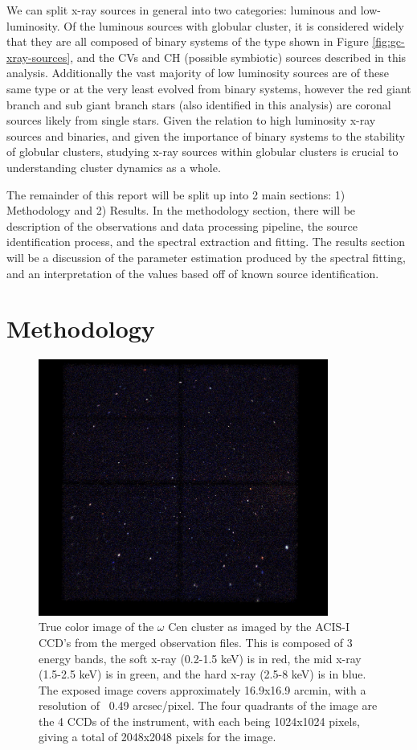 \documentclass[aps,
                pra,  
                a4paper, 
                amsmath, 
                amssymb, 
                preprint,
                tightenlines,  
                amsfonts,
                nofootinbib,
                notitlepage
            ]{revtex4-2}
\begin{document}
We can split x-ray sources in general into two categories: luminous and low-luminosity. Of the luminous sources with globular cluster, it is considered widely that they are all composed of binary systems of the type shown in Figure \ref{fig:gc-xray-sources}, and the CVs and CH (possible symbiotic) sources described in this analysis. Additionally the vast majority of low luminosity sources are of these same type or at the very least evolved from binary systems, however the red giant branch and sub giant branch stars (also identified in this analysis) are coronal sources likely from single stars. Given the relation to high luminosity x-ray sources and binaries, and given the importance of binary systems to the stability of globular clusters, studying x-ray sources within globular clusters is crucial to understanding cluster dynamics as a whole\cite{Verbunt2004,Henleywillis2018}. 
\par
The remainder of this report will be split up into 2 main sections: 1) Methodology and 2) Results. In the methodology section, there will be description of the observations and data processing pipeline, the source identification process, and the spectral extraction and fitting. The results section will be a discussion of the parameter estimation produced by the spectral fitting, and an interpretation of the values based off of known source identification.  

\section{Methodology}
\begin{figure}
    \centering
    \includegraphics[width=0.85\textwidth]{img/truecolor-mx0.75-edit-bright.jpg}
    \caption{True color image of the $\omega$ Cen cluster as imaged by the ACIS-I CCD's from the merged observation files. This is composed of 3 energy bands, the soft x-ray (0.2-1.5 keV) is in red, the mid x-ray (1.5-2.5 keV) is in green, and the hard x-ray (2.5-8 keV) is in blue. The exposed image covers approximately 16.9x16.9 arcmin, with a resolution of ~0.49 arcsec/pixel. The four quadrants of the image are the 4 CCDs of the instrument, with each being 1024x1024 pixels, giving a total of 2048x2048 pixels for the image.}
    \label{fig:truecolor-picture}
\end{figure}
\end{document}

